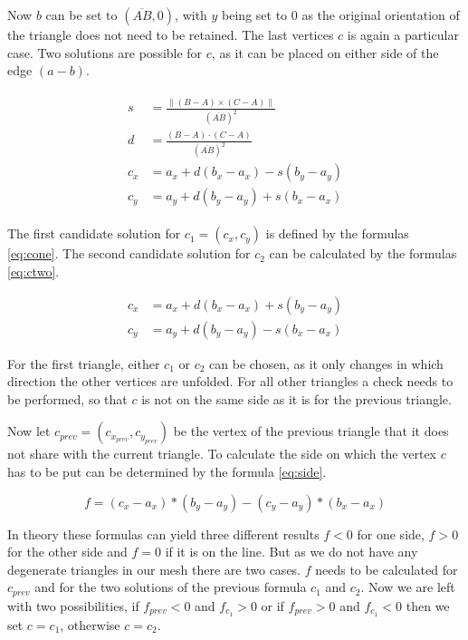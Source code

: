 \documentclass[draft,final]{vutinfth} %
\begin{document}
Now $b$ can be set to $(\overline{AB}, 0)$, with $y$ being set to $0$ as the original orientation of the triangle does not need to be retained. The last vertices $c$ is again a particular case. Two solutions are possible for $c$, as it can be placed on either side of the edge $(a-b)$. 

\begin{align}
\label{eq:cone}
\begin{split}
s &= \frac{\|(B - A)\times(C - A)\|}{(\overline{AB})^2}\\
d &= \frac{(B-A)\cdot(C-A)}{(\overline{AB})^2}\\
c_x &= a_x + d(b_x - a_x) - s(b_y - a_y)\\
c_y &= a_y + d(b_y - a_y) + s(b_x - a_x)
\end{split}
\end{align}

The first candidate solution for $c_1 = (c_x, c_y)$ is defined by the formulas \ref{eq:cone}. The second candidate solution for $c_2$ can be calculated by the formulas \ref{eq:ctwo}. 

\begin{equation}
\label{eq:ctwo}
\begin{split}
c_x &= a_x + d(b_x - a_x) + s(b_y - a_y)\\
c_y &= a_y + d(b_y - a_y) - s(b_x - a_x)
\end{split}
\end{equation}

For the first triangle, either $c_1$ or $c_2$ can be chosen, as it only changes in which direction the other vertices are unfolded. For all other triangles a check needs to be performed, so that $c$ is not on the same side as it is for the previous triangle.


Now let $c_{prev} = (c_{x_{prev}},c_{y_{prev}})$ be the vertex of the previous triangle that it does not share with the current triangle. To calculate the side on which the vertex $c$ has to be put can be determined by the formula \ref{eq:side}.

\begin{equation}
\label{eq:side}
f = (c_x - a_x) * (b_y - a_y) - (c_y - a_y) * (b_x - a_x)
\end{equation}

In theory these formulas can yield three different results $f < 0$ for one side, $f > 0$ for the other side and $f = 0$ if it is on the line. But as we do not have any degenerate triangles in our mesh there are two cases. $f$ needs to be calculated for $c_{prev}$ and for the two solutions of the previous formula $c_1$ and $c_2$. Now we are left with two possibilities, if $f_{prev} < 0$ and $f_{c_1} > 0$ or if $f_{prev} > 0$ and $f_{c_1} < 0$ then we set $c = c_1$, otherwise $c = c_2$.
\end{document}
